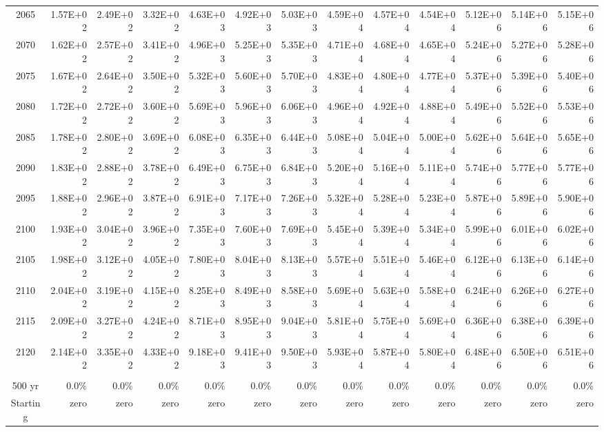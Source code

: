 \documentclass{article}
\begin{document}
\begin{table}
\begin{tabular}{crrr|rrr|rrr|rrr}
2065     & 1.57E+02 & 2.49E+02 & 3.32E+02 & 4.63E+03 & 4.92E+03 & 5.03E+03 & 4.59E+04 & 4.57E+04 & 4.54E+04 & 5.12E+06 & 5.14E+06 & 5.15E+06 \\
2070     & 1.62E+02 & 2.57E+02 & 3.41E+02 & 4.96E+03 & 5.25E+03 & 5.35E+03 & 4.71E+04 & 4.68E+04 & 4.65E+04 & 5.24E+06 & 5.27E+06 & 5.28E+06 \\
2075     & 1.67E+02 & 2.64E+02 & 3.50E+02 & 5.32E+03 & 5.60E+03 & 5.70E+03 & 4.83E+04 & 4.80E+04 & 4.77E+04 & 5.37E+06 & 5.39E+06 & 5.40E+06 \\
2080     & 1.72E+02 & 2.72E+02 & 3.60E+02 & 5.69E+03 & 5.96E+03 & 6.06E+03 & 4.96E+04 & 4.92E+04 & 4.88E+04 & 5.49E+06 & 5.52E+06 & 5.53E+06 \\
2085     & 1.78E+02 & 2.80E+02 & 3.69E+02 & 6.08E+03 & 6.35E+03 & 6.44E+03 & 5.08E+04 & 5.04E+04 & 5.00E+04 & 5.62E+06 & 5.64E+06 & 5.65E+06 \\
2090     & 1.83E+02 & 2.88E+02 & 3.78E+02 & 6.49E+03 & 6.75E+03 & 6.84E+03 & 5.20E+04 & 5.16E+04 & 5.11E+04 & 5.74E+06 & 5.77E+06 & 5.77E+06 \\
2095     & 1.88E+02 & 2.96E+02 & 3.87E+02 & 6.91E+03 & 7.17E+03 & 7.26E+03 & 5.32E+04 & 5.28E+04 & 5.23E+04 & 5.87E+06 & 5.89E+06 & 5.90E+06 \\
2100     & 1.93E+02 & 3.04E+02 & 3.96E+02 & 7.35E+03 & 7.60E+03 & 7.69E+03 & 5.45E+04 & 5.39E+04 & 5.34E+04 & 5.99E+06 & 6.01E+06 & 6.02E+06 \\
2105     & 1.98E+02 & 3.12E+02 & 4.05E+02 & 7.80E+03 & 8.04E+03 & 8.13E+03 & 5.57E+04 & 5.51E+04 & 5.46E+04 & 6.12E+06 & 6.13E+06 & 6.14E+06 \\
2110     & 2.04E+02 & 3.19E+02 & 4.15E+02 & 8.25E+03 & 8.49E+03 & 8.58E+03 & 5.69E+04 & 5.63E+04 & 5.58E+04 & 6.24E+06 & 6.26E+06 & 6.27E+06 \\
2115     & 2.09E+02 & 3.27E+02 & 4.24E+02 & 8.71E+03 & 8.95E+03 & 9.04E+03 & 5.81E+04 & 5.75E+04 & 5.69E+04 & 6.36E+06 & 6.38E+06 & 6.39E+06 \\
2120     & 2.14E+02 & 3.35E+02 & 4.33E+02 & 9.18E+03 & 9.41E+03 & 9.50E+03 & 5.93E+04 & 5.87E+04 & 5.80E+04 & 6.48E+06 & 6.50E+06 & 6.51E+06 \\
         &          &          &          &          &          &          &          &          &          &          &          &          \\ \hline
500 yr   & 0.0\%    & 0.0\%    & 0.0\%    & 0.0\%    & 0.0\%    & 0.0\%    & 0.0\%    & 0.0\%    & 0.0\%    & 0.0\%    & 0.0\%    & 0.0\%    \\
Starting & zero     & zero     & zero     & zero     & zero     & zero     & zero     & zero     & zero     & zero     & zero     & zero     \\

\end{tabular}
\end{table}
\end{document}
